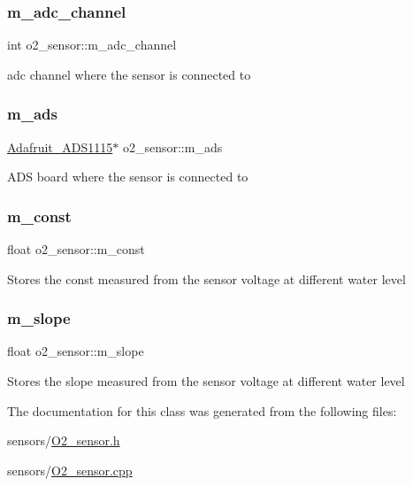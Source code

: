 \subsubsection{\texorpdfstring{m\+\_\+adc\+\_\+channel}{m\_adc\_channel}}
{\footnotesize\ttfamily int o2\+\_\+sensor\+::m\+\_\+adc\+\_\+channel\hspace{0.3cm}{\ttfamily [protected]}}

adc channel where the sensor is connected to \mbox{\label{classo2__sensor_a3287c965f7e5fa40e01cf0f5441cd542}} 
\subsubsection{\texorpdfstring{m\+\_\+ads}{m\_ads}}
{\footnotesize\ttfamily \hyperlink{class_adafruit___a_d_s1115}{Adafruit\+\_\+\+A\+D\+S1115}$\ast$ o2\+\_\+sensor\+::m\+\_\+ads\hspace{0.3cm}{\ttfamily [protected]}}

A\+DS board where the sensor is connected to \mbox{\label{classo2__sensor_afce94a82b320a6de471ccbdba88215dd}} 
\subsubsection{\texorpdfstring{m\+\_\+const}{m\_const}}
{\footnotesize\ttfamily float o2\+\_\+sensor\+::m\+\_\+const\hspace{0.3cm}{\ttfamily [protected]}}

Stores the const measured from the sensor voltage at different water level \mbox{\label{classo2__sensor_ae64844128c35556e8b5c26d025923640}} 
\subsubsection{\texorpdfstring{m\+\_\+slope}{m\_slope}}
{\footnotesize\ttfamily float o2\+\_\+sensor\+::m\+\_\+slope\hspace{0.3cm}{\ttfamily [protected]}}

Stores the slope measured from the sensor voltage at different water level 

The documentation for this class was generated from the following files\+:\begin{DoxyCompactItemize}
\item 
sensors/\hyperlink{_o2__sensor_8h}{O2\+\_\+sensor.\+h}\item 
sensors/\hyperlink{_o2__sensor_8cpp}{O2\+\_\+sensor.\+cpp}\end{DoxyCompactItemize}
